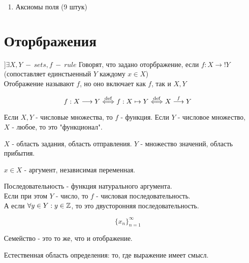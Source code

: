 \documentclass[12pt, a4paper]{article}
\begin{document}
  \begin{enumerate}[]
  \item Аксиомы поля (9 штук)
  \end{enumerate}





  \section{Оторбражения}

  \begin{definition}[Отображение]
  $] \exists X, Y~-~sets, f~-~rule$
  Говорят, что задано оторбражение, если $f: X \longrightarrow! Y$ \\
  (сопоставляет единстыенный $Y$ каждому $x \in X$)\\

  Отображение называют $f$, но оно включает как $f$, так и $X, Y$  
  \end{definition}


  \begin{equation}
  f: X \longrightarrow Y \overset{\mathrm{def}}{\Longleftrightarrow} f: X \mapsto Y \overset{\mathrm{def}}{\Longleftrightarrow} X \overset{f}{\longrightarrow} Y
  \end{equation}


  Если $X, Y$ - числовые множества, то $f$ - функция.
  Если $Y$ - числовое множество, $X$ - любое, то это "функционал".

  $X$ - область задания, область отправления.
  $Y$ - множество значений, область прибытия.

  $x \in X$ - аргумент, независимая переменная.

  \begin{definition}[Последователности]
  Последовательность - функция натурального аргумента.\\
  Если при этом $Y$ - число, то $f$ - числовая последовательность.\\
  А если $\forall y \in Y: y \in {\mathbb{Z}}$, то это двусторонняя последовательность.
  \end{definition}

  \begin{equation}
  \{x_n\}_{n = 1}^{\infty}
  \end{equation}

  \begin{definition}
  Семейство - это то же, что и отображение.
  \end{definition}

  \begin{definition}
  Естественная область определения: то, где выражение имеет смысл.
  \end{definition}
\end{document}
